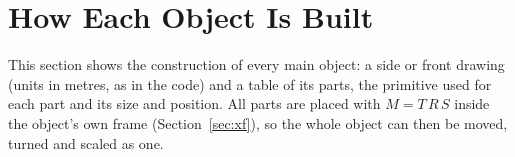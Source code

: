 \section{How Each Object Is Built}\label{sec:build}
This section shows the construction of every main object: a side or front drawing (units in metres, as in the code) and a table of its parts, the primitive used for each part and its size and position. All parts are placed with $M=T\,R\,S$ inside the object's own frame (Section~\ref{sec:xf}), so the whole object can then be moved, turned and scaled as one.

\newcommand{\objcard}[3]{\par\medskip\noindent
\begin{minipage}[c]{0.34\textwidth}\centering #2\end{minipage}\hfill
\begin{minipage}[c]{0.63\textwidth}{\color{ramen}\bfseries #1}\par\vspace{1pt}\footnotesize #3\end{minipage}\par\smallskip}
\newcommand{\parts}[1]{\begin{tabular}{@{}p{2.05cm}p{2.25cm}p{5.85cm}@{}}\toprule\textbf{Part}&\textbf{Primitive}&\textbf{Size / placement}\\\midrule #1\bottomrule\end{tabular}}

